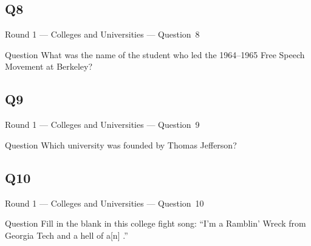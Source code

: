 \documentclass[11pt]{beamer}
\begin{document}
\subsection*{Q8}
\begin{frame}[t]{Round 1 --- Colleges and Universities --- \mbox{Question 8}}
\vspace{-0.5em}
\begin{block}{Question}
What was the name of the student who led the 1964--1965 Free Speech Movement at Berkeley?
\end{block}
\end{frame}
\subsection*{Q9}
\begin{frame}[t]{Round 1 --- Colleges and Universities --- \mbox{Question 9}}
\vspace{-0.5em}
\begin{block}{Question}
Which university was founded by Thomas Jefferson?
\end{block}
\end{frame}
\subsection*{Q10}
\begin{frame}[t]{Round 1 --- Colleges and Universities --- \mbox{Question 10}}
\vspace{-0.5em}
\begin{block}{Question}
Fill in the blank in this college fight song: ``I'm a Ramblin' Wreck from Georgia Tech and a hell of a[n] \textunderscore{}\textunderscore{}\textunderscore{}\textunderscore{}\textunderscore{}.'' 
\end{block}
\end{frame}
\end{document}
